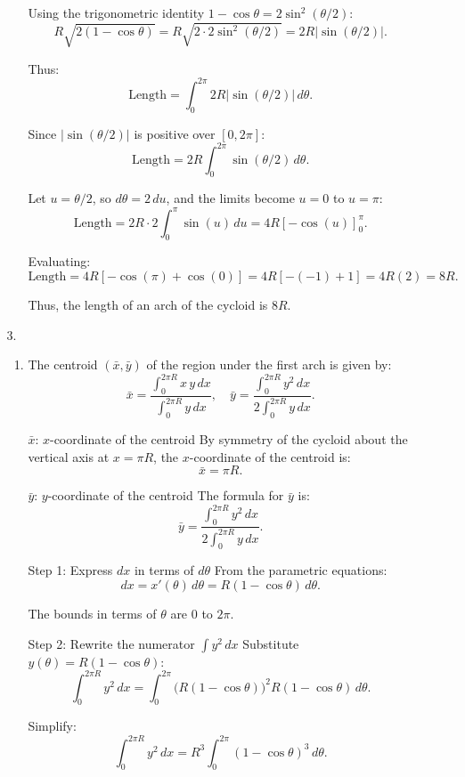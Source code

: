 \documentclass[12pt]{article}
\begin{document}
\begin{enumerate}
\begin{enumerate}
\begin{enumerate}
Using the trigonometric identity \( 1 - \cos\theta = 2\sin^2(\theta/2) \):
\[
R\sqrt{2(1 - \cos\theta)} = R\sqrt{2 \cdot 2\sin^2(\theta/2)} = 2R|\sin(\theta/2)|.
\]

Thus:
\[
\text{Length} = \int_{0}^{2\pi} 2R|\sin(\theta/2)| \, d\theta.
\]

Since \( |\sin(\theta/2)| \) is positive over \( [0, 2\pi] \):
\[
\text{Length} = 2R \int_{0}^{2\pi} \sin(\theta/2) \, d\theta.
\]

Let \( u = \theta/2 \), so \( d\theta = 2 \, du \), and the limits become \( u = 0 \) to \( u = \pi \):
\[
\text{Length} = 2R \cdot 2 \int_{0}^{\pi} \sin(u) \, du = 4R \left[-\cos(u)\right]_{0}^{\pi}.
\]

Evaluating:
\[
\text{Length} = 4R \left[-\cos(\pi) + \cos(0)\right] = 4R \left[-(-1) + 1\right] = 4R(2) = 8R.
\]

Thus, the length of an arch of the cycloid is \( 8R \).


\end{enumerate}
\item [3. ]
\begin{enumerate}
\item The centroid \((\bar{x}, \bar{y})\) of the region under the first arch is given by:
\[
\bar{x} = \frac{\int_{0}^{2\pi R} x \, y \, dx}{\int_{0}^{2\pi R} y \, dx}, \quad
\bar{y} = \frac{\int_{0}^{2\pi R} y^2 \, dx}{2\int_{0}^{2\pi R} y \, dx}.
\]

\( \bar{x} \): \( x \)-coordinate of the centroid
By symmetry of the cycloid about the vertical axis at \( x = \pi R \), the \( x \)-coordinate of the centroid is:
\[
\bar{x} = \pi R.
\]

\( \bar{y} \): \( y \)-coordinate of the centroid
The formula for \( \bar{y} \) is:
\[
\bar{y} = \frac{\int_{0}^{2\pi R} y^2 \, dx}{2\int_{0}^{2\pi R} y \, dx}.
\]

Step 1: Express \( dx \) in terms of \( d\theta \)
From the parametric equations:
\[
dx = x'(\theta) \, d\theta = R(1 - \cos\theta) \, d\theta.
\]

The bounds in terms of \( \theta \) are \( 0 \) to \( 2\pi \).

Step 2: Rewrite the numerator \( \int y^2 \, dx \)
Substitute \( y(\theta) = R(1 - \cos\theta) \):
\[
\int_{0}^{2\pi R} y^2 \, dx = \int_{0}^{2\pi} \big(R(1 - \cos\theta)\big)^2 R(1 - \cos\theta) \, d\theta.
\]

Simplify:
\[
\int_{0}^{2\pi R} y^2 \, dx = R^3 \int_{0}^{2\pi} (1 - \cos\theta)^3 \, d\theta.
\]


\end{enumerate}
\end{enumerate}
\end{enumerate}
\end{document}
